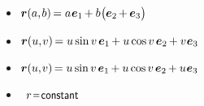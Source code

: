 \begin{tcolorbox}
\small\setlength{\abovedisplayskip}{2pt}\setlength{\belowdisplayskip}{2pt}

\emph{}

\begin{itemize}

\vspace{.2em}\item
{}  \href{https://en.wikipedia.org/wiki/Plane_(geometry)}{}
${\bm{r}(a,\hspace{-0.15ex} b) \hspace{-0.25ex} = a \hspace{.1ex} \bm{e}_1 \hspace{-0.2ex} + b \hspace{.1ex} \bigl( \hspace{-0.1ex} \bm{e}_2 \hspace{-0.2ex} + \hspace{-0.1ex} \bm{e}_3 \bigr)}$

\vspace{.2em}\item
{}\href{https://en.wikipedia.org/wiki/Helicoid}{}
${\bm{r}(u,\hspace{-0.2ex} v) \hspace{-0.25ex} = u \operatorname{sin} v \hspace{.33ex} \bm{e}_1 \hspace{-0.15ex} + u \operatorname{cos} v \hspace{.33ex} \bm{e}_2 \hspace{-0.15ex} + v \hspace{.1ex} \bm{e}_3}$

\vspace{.2em}\item
{}
${\bm{r}(u,\hspace{-0.2ex} v) \hspace{-0.25ex} = u \operatorname{sin} v \hspace{.33ex} \bm{e}_1 \hspace{-0.15ex} + u \operatorname{cos} v \hspace{.33ex} \bm{e}_2 \hspace{-0.15ex} + u \hspace{.1ex} \bm{e}_3}$

\vspace{.2em}\item
{} ~${r \narroweq \constant}$


\end{itemize}
\end{tcolorbox}
